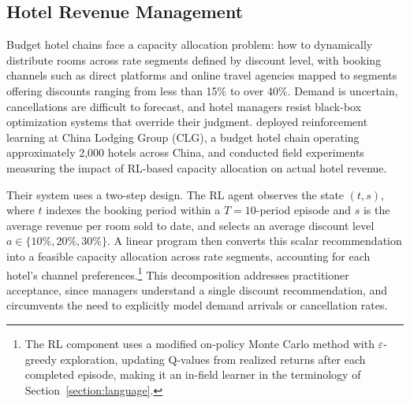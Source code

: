 %
%


\subsection{Hotel Revenue Management}
\label{sec:hotel}

Budget hotel chains face a capacity allocation problem: how to dynamically distribute rooms across rate segments defined by discount level, with booking channels such as direct platforms and online travel agencies mapped to segments offering discounts ranging from less than 15\% to over 40\%. Demand is uncertain, cancellations are difficult to forecast, and hotel managers resist black-box optimization systems that override their judgment. \citet{Chen2023hotelrl} deployed reinforcement learning at China Lodging Group (CLG), a budget hotel chain operating approximately 2,000 hotels across China, and conducted field experiments measuring the impact of RL-based capacity allocation on actual hotel revenue.

Their system uses a two-step design. The RL agent observes the state $(t, s)$, where $t$ indexes the booking period within a $T = 10$-period episode and $s$ is the average revenue per room sold to date, and selects an average discount level $a \in \{10\%, 20\%, 30\%\}$. A linear program then converts this scalar recommendation into a feasible capacity allocation across rate segments, accounting for each hotel's channel preferences.\footnote{The RL component uses a modified on-policy Monte Carlo method with $\varepsilon$-greedy exploration, updating Q-values from realized returns after each completed episode, making it an in-field learner in the terminology of Section~\ref{section:language}.} This decomposition addresses practitioner acceptance, since managers understand a single discount recommendation, and circumvents the need to explicitly model demand arrivals or cancellation rates.

